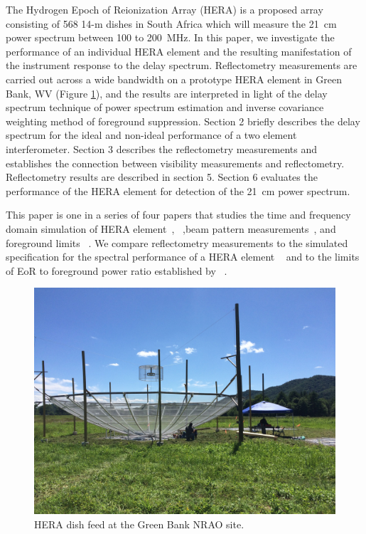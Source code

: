\documentclass[twocolumn]{emulateapj}
\begin{document}
\indent The Hydrogen Epoch of Reionization Array (HERA) is a proposed array
consisting of 568 14-m dishes in South Africa which will measure the 21~cm
power spectrum between 100 to 200~MHz.
In this paper, we investigate the performance of an individual HERA element and
the resulting manifestation of the instrument response to the delay spectrum.
Reflectometry measurements  are carried out across a wide bandwidth on a
prototype HERA element in Green Bank, WV (Figure \ref{fig:heradish}), and the
results are interpreted in light of the delay spectrum technique of power
spectrum estimation and inverse covariance weighting method of foreground
suppression. Section 2 briefly describes the delay spectrum for the ideal and
non-ideal performance of a two element interferometer. Section 3 describes the
reflectometry measurements and establishes the connection between visibility
measurements and reflectometry. Reflectometry results are described in section
5. Section 6 evaluates the performance of the HERA element for detection of the
21~cm power spectrum.

This paper is one in a series of four papers that studies the time and frequency domain simulation of  HERA element~\citep{Ewall-Wice_et_al2016}, ~\citep{ddboer_et_al2016},beam pattern measurements~\citep{Neben_et_al2016}, and foreground limits ~\citep{Thyagarajan_et_al2016}. We compare 
reflectometry measurements to the simulated specification for the spectral performance of a HERA element ~\citep{ddboer_et_al2016} and to the limits of EoR to foreground power ratio established by ~\citep{Thyagarajan_et_al2016}. 
\begin{figure}
\centering
\includegraphics[trim={2cm 20cm 30cm 15cm},clip, totalheight=0.3\textheight]{plots/heradish.jpg}
\caption{HERA dish feed at the Green Bank NRAO site.}
\label{fig:heradish}
\end{figure}
\end{document}
